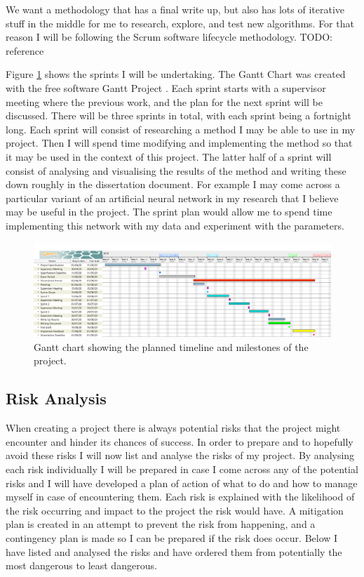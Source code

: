 \documentclass{article}
\begin{document}
We want a methodology that has a final write up, but also has lots of iterative stuff in the middle for me to research, explore, and test new algorithms.
For that reason I will be following the Scrum software lifecycle methodology.
TODO: reference 

Figure \ref{fig:Gantt} shows the sprints I will be undertaking.
The Gantt Chart was created with the free software Gantt Project \cite{GanttProject}.
Each sprint starts with a supervisor meeting where the previous work, and the plan for the next sprint will be discussed.
There will be three sprints in total, with each sprint being a fortnight long.
Each sprint will consist of researching a method I may be able to use in my project.
Then I will spend time modifying and implementing the method so that it may be used in the context of this project.
The latter half of a sprint will consist of analysing and visualising the results of the method and writing these down roughly in the dissertation document.
For example I may come across a particular variant of an artificial neural network in my research that I believe may be useful in the project.
The sprint plan would allow me to spend time implementing this network with my data and experiment with the parameters.  


\begin{figure}[ht]
    \centering
    \centerline{
        \includegraphics[scale=0.32]{GanttChart.PNG}
    }
    \caption{Gantt chart showing the planned timeline and milestones of the project.}
    \label{fig:Gantt}
\end{figure}


\subsection{Risk Analysis}
When creating a project there is always potential risks that the project might encounter and hinder its chances of success. 
In order to prepare and to hopefully avoid these risks I will now list and analyse the risks of my project. 
By analysing each risk individually I will be prepared in case I come across any of the potential risks and I will have developed a plan of action of what to do and how to manage myself in case of encountering them. 
Each risk is explained with the likelihood of the risk occurring and impact to the project the risk would have.
A mitigation plan is created in an attempt to prevent the risk from happening, and a contingency plan is made so I can be prepared if the risk does occur.
Below I have listed and analysed the risks and have ordered them from potentially the most dangerous to least dangerous. 
\end{document}
